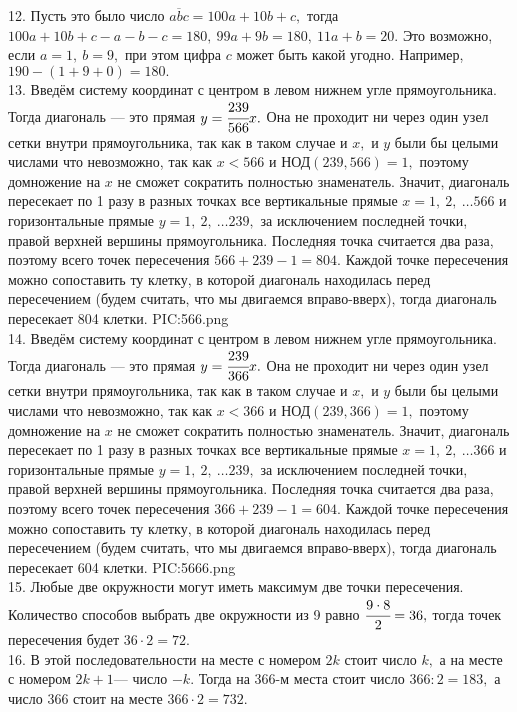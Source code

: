 12. Пусть это было число $\overline{abc}=100a+10b+c,$ тогда $100a+10b+c-a-b-c=180,\ 99a+9b=180,\ 11a+b=20.$ Это возможно, если $a=1,\ b=9,$ при этом цифра $c$ может быть какой угодно. Например, $190-(1+9+0)=180.$\\
13. Введём систему координат с центром в левом нижнем угле прямоугольника. Тогда диагональ --- это прямая $y=\cfrac{239}{566}x.$ Она не проходит ни через один узел сетки внутри прямоугольника, так как в таком случае и $x,$ и $y$ были бы целыми числами что невозможно, так как $x<566$ и $\text{НОД}(239,566)=1,$ поэтому домножение на $x$ не сможет сократить полностью знаменатель. Значит, диагональ пересекает по 1 разу в разных точках все вертикальные прямые $x=1,\ 2,\ \ldots 566$ и горизонтальные прямые $y=1,\ 2,\ \ldots 239,$ за исключением последней точки, правой верхней вершины прямоугольника. Последняя точка считается два раза, поэтому всего точек пересечения $566+239-1=804.$ Каждой точке пересечения можно сопоставить ту клетку, в которой диагональ находилась перед пересечением (будем считать, что мы двигаемся вправо-вверх), тогда диагональ пересекает 804 клетки.
{{PIC:566.png}}\\
14. Введём систему координат с центром в левом нижнем угле прямоугольника. Тогда диагональ --- это прямая $y=\cfrac{239}{366}x.$ Она не проходит ни через один узел сетки внутри прямоугольника, так как в таком случае и $x,$ и $y$ были бы целыми числами что невозможно, так как $x<366$ и $\text{НОД}(239,366)=1,$ поэтому домножение на $x$ не сможет сократить полностью знаменатель. Значит, диагональ пересекает по 1 разу в разных точках все вертикальные прямые $x=1,\ 2,\ \ldots 366$ и горизонтальные прямые $y=1,\ 2,\ \ldots 239,$ за исключением последней точки, правой верхней вершины прямоугольника. Последняя точка считается два раза, поэтому всего точек пересечения $366+239-1=604.$ Каждой точке пересечения можно сопоставить ту клетку, в которой диагональ находилась перед пересечением (будем считать, что мы двигаемся вправо-вверх), тогда диагональ пересекает 604 клетки.
{{PIC:5666.png}}\\
15. Любые две окружности могут иметь максимум две точки пересечения. Количество способов выбрать две окружности из 9 равно $\cfrac{9\cdot8}{2}=36,$ тогда точек пересечения будет $36\cdot2=72.$\\
16. В этой последовательности на месте с номером $2k$ стоит число $k,$ а на месте с номером $2k+1$--- число $-k.$ Тогда на 366-м места стоит число $366:2=183,$ а число 366 стоит на месте $366\cdot2=732.$\\

